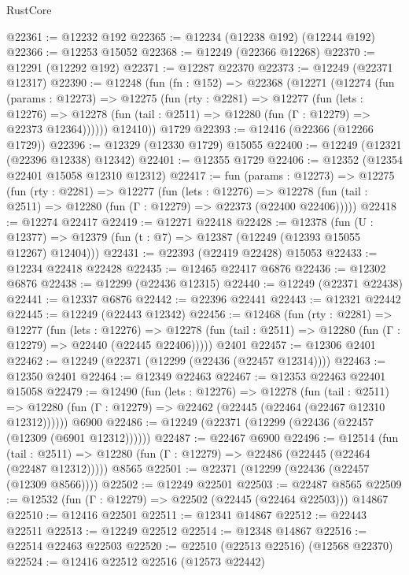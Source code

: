 \begin{lexlean}{RustCore}
\begin{coremodule}
@22361 := @12232 @192
@22365 := @12234 (@12238 @192) (@12244 @192)
@22366 := @12253 @15052
@22368 := @12249 (@22366 @12268)
@22370 := @12291 (@12292 @192)
@22371 := @12287 @22370
@22373 := @12249 (@22371 @12317)
@22390 := @12248
    (fun (fn : @152) =>
    @22368
      (@12271
        (@12274
          (fun (params : @12273) =>
          @12275
            (fun (rty : @2281) =>
            @12277
              (fun (lets : @12276) =>
              @12278 (fun (tail : @2511) => @12280 (fun (Γ : @12279) => @22373 @12364))))))
        @12410))
    @1729
@22393 := @12416 (@22366 (@12266 @1729))
@22396 := @12329 (@12330 @1729) @15055
@22400 := @12249 (@12321 (@22396 @12338) @12342)
@22401 := @12355 @1729
@22406 := @12352 (@12354 @22401 @15058 @12310 @12312)
@22417 := fun (params : @12273) =>
  @12275
    (fun (rty : @2281) =>
    @12277
      (fun (lets : @12276) =>
      @12278 (fun (tail : @2511) => @12280 (fun (Γ : @12279) => @22373 (@22400 @22406)))))
@22418 := @12274 @22417
@22419 := @12271 @22418
@22428 := @12378
    (fun (U : @12377) => @12379 (fun (t : @7) => @12387 (@12249 (@12393 @15055 @12267) @12404)))
@22431 := @22393 (@22419 @22428) @15053
@22433 := @12234 @22418 @22428
@22435 := @12465 @22417 @6876
@22436 := @12302 @6876
@22438 := @12299 (@22436 @12315)
@22440 := @12249 (@22371 @22438)
@22441 := @12337 @6876
@22442 := @22396 @22441
@22443 := @12321 @22442
@22445 := @12249 (@22443 @12342)
@22456 := @12468
    (fun (rty : @2281) =>
    @12277
      (fun (lets : @12276) =>
      @12278 (fun (tail : @2511) => @12280 (fun (Γ : @12279) => @22440 (@22445 @22406)))))
    @2401
@22457 := @12306 @2401
@22462 := @12249 (@22371 (@12299 (@22436 (@22457 @12314))))
@22463 := @12350 @2401
@22464 := @12349 @22463
@22467 := @12353 @22463 @22401 @15058
@22479 := @12490
    (fun (lets : @12276) =>
    @12278
      (fun (tail : @2511) =>
      @12280 (fun (Γ : @12279) => @22462 (@22445 (@22464 (@22467 @12310 @12312))))))
    @6900
@22486 := @12249 (@22371 (@12299 (@22436 (@22457 (@12309 (@6901 @12312))))))
@22487 := @22467 @6900
@22496 := @12514
    (fun (tail : @2511) => @12280 (fun (Γ : @12279) => @22486 (@22445 (@22464 (@22487 @12312)))))
    @8565
@22501 := @22371 (@12299 (@22436 (@22457 (@12309 @8566))))
@22502 := @12249 @22501
@22503 := @22487 @8565
@22509 := @12532 (fun (Γ : @12279) => @22502 (@22445 (@22464 @22503))) @14867
@22510 := @12416 @22501
@22511 := @12341 @14867
@22512 := @22443 @22511
@22513 := @12249 @22512
@22514 := @12348 @14867
@22516 := @22514 @22463 @22503
@22520 := @22510 (@22513 @22516) (@12568 @22370)
@22524 := @12416 @22512 @22516 (@12573 @22442)

\end{coremodule}
\end{lexlean}
